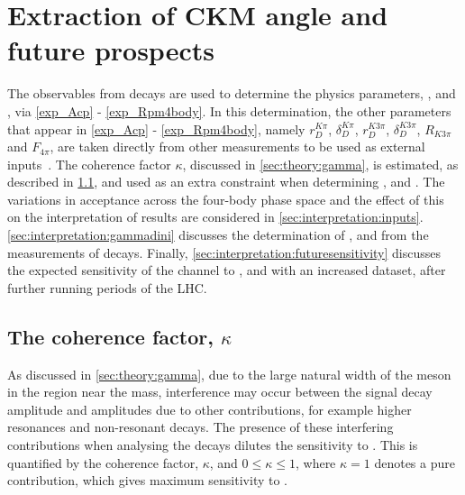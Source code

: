 \clearpage
%

\chapter{\label{ch:6-interpretation}Extraction of CKM angle \Pgamma and future prospects} 


The \CP observables from \btodkst decays are used to determine the physics parameters, \rb, \deltab and \Pgamma, via \eqns\ref{exp_Acp} - \ref{exp_Rpm4body}. In this determination, the other parameters that appear in \eqns\ref{exp_Acp} - \ref{exp_Rpm4body}, namely $r_D^{K\pi}$, $\delta_D^{K\pi}$, $r_D^{K3\pi}$, $\delta_D^{K3\pi}$, $R_{K3\pi}$ and $F_{4\pi}$, are taken directly from other measurements to be used as external inputs~\cite{HFAG,charmk3pi,charmk3pi_errata,charm4pi}. The coherence factor $\kappa$, discussed in \sect\ref{sec:theory:gamma}, is estimated, as described in \sect\ref{sec:interpretation:coherence}, and used as an extra constraint when determining \rb, \deltab and \Pgamma. The variations in acceptance across the four-body phase space and the effect of this on the interpretation of results are considered in \sect\ref{sec:interpretation:inputs}. \Sect\ref{sec:interpretation:gammadini} discusses the determination of \rb, \deltab and \Pgamma from the measurements of \btodkst decays. Finally, \sect\ref{sec:interpretation:futuresensitivity} discusses the expected sensitivity of the \btodkst channel to \rb, \deltab and \Pgamma with an increased dataset, after further running periods of the LHC.

\section{The coherence factor, $\kappa$}
\label{sec:interpretation:coherence}

As discussed in \sect\ref{sec:theory:gamma}, due to the large natural width of the \Kstarm meson in the region near the \Kstarm mass, interference may occur between the signal \Kstarm decay amplitude and amplitudes due to other \decay{\Bm}{\D\KS\pim} contributions, for example higher \KS\pim resonances and non-resonant decays. The presence of these interfering contributions when analysing the \btodkst decays dilutes the sensitivity to \Pgamma. This is quantified by the coherence factor, $\kappa$, and $0 \leq \kappa \leq 1$, where $\kappa = 1$ denotes a pure \Kstarm contribution, which gives maximum sensitivity to \Pgamma. 

